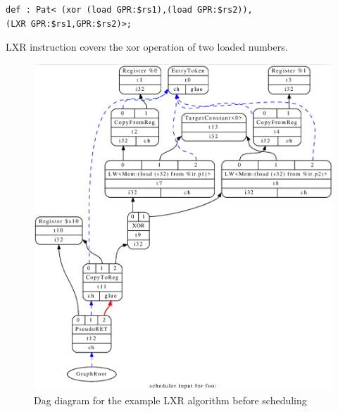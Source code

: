 \begin{lstlisting}
def : Pat< (xor (load GPR:$rs1),(load GPR:$rs2)),
(LXR GPR:$rs1,GPR:$rs2)>;
\end{lstlisting}

LXR instruction covers the xor operation of two loaded numbers.


\begin{figure}
    \centering
    \includegraphics[scale=0.25]{adding_new_instr/lxr_sched.png}
    \caption{Dag diagram for the example LXR algorithm before scheduling}
    \label{fig:lxr_sched_diagram}
\end{figure}



